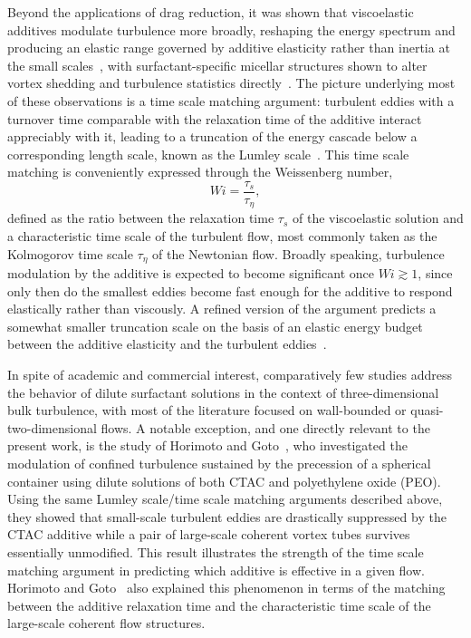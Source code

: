 \documentclass[aps,prfluids,groupedaddress,showkeys,11pt,tightenlines]{revtex4-2}
\begin{document}
Beyond the applications of drag reduction, it was shown that viscoelastic additives modulate turbulence more broadly, reshaping the energy spectrum and producing an elastic range governed by additive elasticity rather than inertia at the small scales~\cite{groisman2000,zhang2021sciadv}, with surfactant-specific micellar structures shown to alter vortex shedding and turbulence statistics directly~\cite{fukushima2022jfm}. The picture underlying most of these observations is a time scale matching argument: turbulent eddies with a turnover time comparable with the relaxation time of the additive interact appreciably with it, leading to a truncation of the energy cascade below a corresponding length scale, known as the Lumley scale~\cite{lumley1969,lumley1973}. This time scale matching is conveniently expressed through the Weissenberg number,
\begin{equation}
    Wi = \frac{\tau_s}{\tau_\eta},
    \label{eq:Wi}
\end{equation}
defined as the ratio between the relaxation time $\tau_s$ of the viscoelastic solution and a characteristic time scale of the turbulent flow, most commonly taken as the Kolmogorov time scale $\tau_\eta$ of the Newtonian flow. Broadly speaking, turbulence modulation by the additive is expected to become significant once $Wi \gtrsim 1$, since only then do the smallest eddies become fast enough for the additive to respond elastically rather than viscously. A refined version of the argument predicts a somewhat smaller truncation scale on the basis of an elastic energy budget between the additive elasticity and the turbulent eddies~\cite{tabor_degennes1986}.

In spite of academic and commercial interest, comparatively few studies address the behavior of dilute surfactant solutions in the context of three-dimensional bulk turbulence, with most of the literature focused on wall-bounded or quasi-two-dimensional flows. A notable exception, and one directly relevant to the present work, is the study of Horimoto and Goto~\cite{horimoto_goto_2017}, who investigated the modulation of confined turbulence sustained by the precession of a spherical container using dilute solutions of both CTAC and polyethylene oxide (PEO). Using the same Lumley scale/time scale matching arguments described above, they showed that small-scale turbulent eddies are drastically suppressed by the CTAC additive while a pair of large-scale coherent vortex tubes survives essentially unmodified. This result illustrates the strength of the time scale matching argument in predicting which additive is effective in a given flow. Horimoto and Goto~\cite{horimoto_goto_2017} also explained this phenomenon in terms of the matching between the additive relaxation time and the characteristic time scale of the large-scale coherent flow structures.
\end{document}

